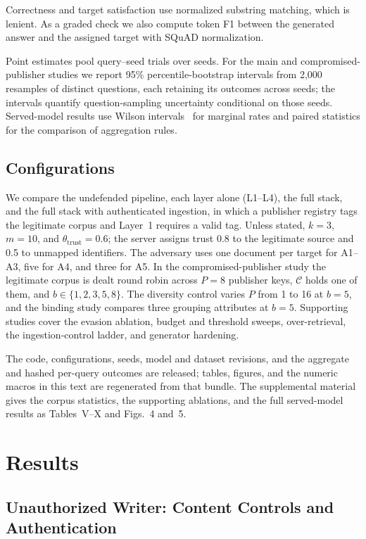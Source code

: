 \documentclass[lettersize,journal]{IEEEtran}
\newcommand{\AdvC}{\mathcal{C}}
\begin{document}
Correctness and target satisfaction use normalized substring matching, which is lenient. As a
graded check we also compute token F1 between the generated answer and the assigned target
with SQuAD normalization.

Point estimates pool query--seed trials over \nSeeds{} seeds. For the main and
compromised-publisher studies we report 95\% percentile-bootstrap intervals from 2,000
resamples of distinct questions, each retaining its outcomes across seeds; the intervals
quantify question-sampling uncertainty conditional on those seeds. Served-model results use
Wilson intervals~\cite{wilson1927,brown2001interval} for marginal rates and paired statistics
for the comparison of aggregation rules.

\subsection{Configurations}

We compare the undefended pipeline, each layer alone (L1--L4), the full stack, and the full
stack with authenticated ingestion, in which a publisher registry tags the legitimate corpus
and Layer~1 requires a valid tag. Unless stated, $k = 3$, $m = 10$, and
$\theta_{\mathrm{trust}} = 0.6$; the server assigns trust 0.8 to the legitimate source and 0.5
to unmapped identifiers. The adversary uses one document per target for A1--A3, five for A4,
and three for A5. In the compromised-publisher study the legitimate corpus is dealt round
robin across $P = 8$ publisher keys, $\AdvC$ holds one of them, and $b \in \{1,2,3,5,8\}$.
The diversity control varies $P$ from 1 to 16 at $b = 5$, and the binding study compares three
grouping attributes at $b = 5$. Supporting studies cover the evasion ablation, budget and
threshold sweeps, over-retrieval, the ingestion-control ladder, and generator hardening.

The code, configurations, seeds, model and dataset revisions, and the aggregate and hashed
per-query outcomes are released; tables, figures, and the numeric macros in this text are
regenerated from that bundle. The supplemental material gives the corpus statistics, the
supporting ablations, and the full served-model results as Tables~V--X and Figs.~4 and~5.

\section{Results}
\label{sec:results}

\subsection{Unauthorized Writer: Content Controls and Authentication}
\label{sec:res:adaptive}
\end{document}

